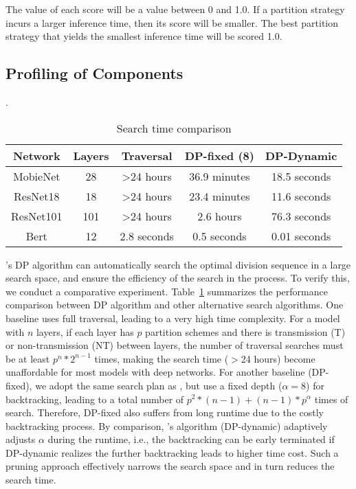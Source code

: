 The value of each score will be a value between 0 and 1.0. If a partition strategy incurs a larger inference time, then its score will be smaller. The best partition strategy that yields the smallest inference time will be scored 1.0. 

\iffalse 
\subsection{Profiling of \sysname Components}
\label{sec-Search Time Comparison}

.
\begin{table}[t]
\renewcommand\arraystretch{1}
	\centering
	\caption{Search time comparison}
	\label{tab:search-cmp}
\footnotesize
	\begin{tabular}{ccccc}
		\hline
		Network&Layers & Traversal  &  DP-fixed (8) &DP-Dynamic \\
		\hline
            MobieNet & 28   & \textgreater 24 hours & 36.9 minutes& 18.5 seconds   \\
            ResNet18 &  18  & \textgreater 24 hours &  23.4 minutes& 11.6 seconds   \\
            ResNet101&  101 & \textgreater 24 hours &  2.6 hours& 76.3 seconds   \\
            Bert     &  12  &   2.8 seconds         &  0.5 seconds& 0.01 seconds \\
            \hline
	\end{tabular} 
\end{table}
\sysname's DP algorithm can automatically search the optimal division sequence in a large search space, and ensure the efficiency of the search in the process. To verify this, we conduct a comparative experiment. Table~\ref{tab:search-cmp} summarizes the performance comparison between DP algorithm and other alternative search algorithms. One baseline uses full traversal, leading to a very high time complexity. For a model with $n$ layers, if each layer has $p$ partition schemes and there is transmission (T) or non-transmission (NT) between layers, the number of traversal searches must be at least $p^n*2^{n-1}$ times, making the search time ($>$24 hours) become unaffordable for most models with deep networks. For another baseline (DP-fixed), we adopt the same search plan as \sysname, but use a fixed depth ($\alpha=8$) for backtracking, leading to a total number of $p^2*(n-1)+(n-1)*p^\alpha$ times of search. Therefore, DP-fixed also suffers from long runtime due to the costly backtracking process. By comparison, \sysname's algorithm (DP-dynamic) adaptively adjusts $\alpha$ during the runtime, i.e., the backtracking can be early terminated if DP-dynamic realizes the further backtracking leads to higher time cost. Such a pruning approach effectively narrows the search space and in turn reduces the search time.





